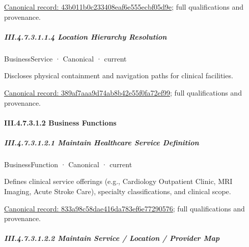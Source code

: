 {\footnotesize \href{../../../../../../../continuum/business/business-service/43b011b0c233408eaf6e555ecbf05d9e.md}{Canonical record: 43b011b0c233408eaf6e555ecbf05d9e}; full qualifications and provenance.}\par
\subparagraph*{III.4.7.3.1.1.4 Location Hierarchy Resolution}
\label{navigation:III.4.7.3.1.1.4}

\label{element:389af7aaa9d74ab8b42e55f0fa72ef99}
{\small BusinessService · Canonical · current}\par

Discloses physical containment and navigation paths for clinical facilities.


{\footnotesize \href{../../../../../../../continuum/business/business-service/389af7aaa9d74ab8b42e55f0fa72ef99.md}{Canonical record: 389af7aaa9d74ab8b42e55f0fa72ef99}; full qualifications and provenance.}\par
\paragraph*{III.4.7.3.1.2 Business Functions}
\label{navigation:III.4.7.3.1.2}

\subparagraph*{III.4.7.3.1.2.1 Maintain Healthcare Service Definition}
\label{navigation:III.4.7.3.1.2.1}

\label{element:833a98c58dae416da783ef6e77290576}
{\small BusinessFunction · Canonical · current}\par

Defines clinical service offerings (e.g., Cardiology Outpatient Clinic, MRI Imaging, Acute Stroke Care), specialty classifications, and clinical scope.


{\footnotesize \href{../../../../../../../continuum/business/business-function/833a98c58dae416da783ef6e77290576.md}{Canonical record: 833a98c58dae416da783ef6e77290576}; full qualifications and provenance.}\par
\subparagraph*{III.4.7.3.1.2.2 Maintain Service / Location / Provider Map}
\label{navigation:III.4.7.3.1.2.2}

